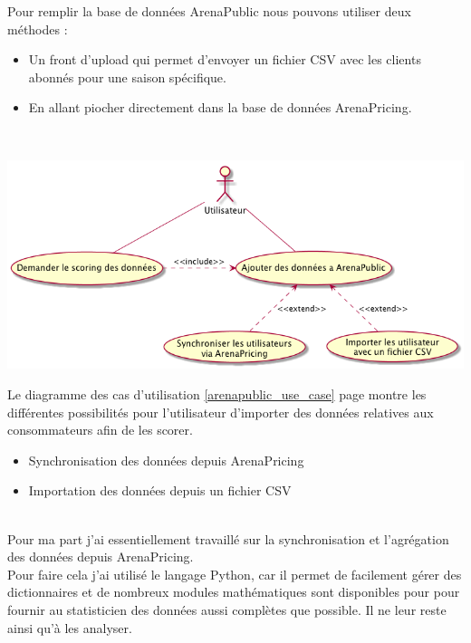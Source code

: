 Pour remplir la base de données ArenaPublic nous pouvons utiliser deux méthodes : 
\begin{itemize}
  \item[\textbullet] Un front d'upload qui permet d'envoyer un fichier CSV avec les clients abonnés pour une saison spécifique.
  \item[\textbullet] En allant piocher directement dans la base de données ArenaPricing.
  \end{itemize} \
  
\begin{center}
\includegraphics[scale=0.6]{images/arenapublic-use-case.png}
\label{arenapublic_use_case}
\end{center}

Le diagramme des cas d'utilisation \ref{arenapublic_use_case} page \pageref{arenapublic_use_case} montre les différentes possibilités pour l'utilisateur d'importer des données relatives aux consommateurs afin de les scorer.
\begin{itemize}
	\item[\textbullet] Synchronisation des données depuis ArenaPricing 
	\item[\textbullet] Importation des données depuis un fichier CSV 
\end{itemize}
\leavevmode \\

Pour ma part j'ai essentiellement travaillé sur la synchronisation et l'agrégation des données depuis ArenaPricing. 
\\

Pour faire cela j'ai utilisé le langage Python, car il permet de facilement gérer des dictionnaires et de nombreux modules mathématiques sont disponibles pour pour fournir au statisticien des données aussi complètes que possible. Il ne leur reste ainsi qu'à les analyser.

